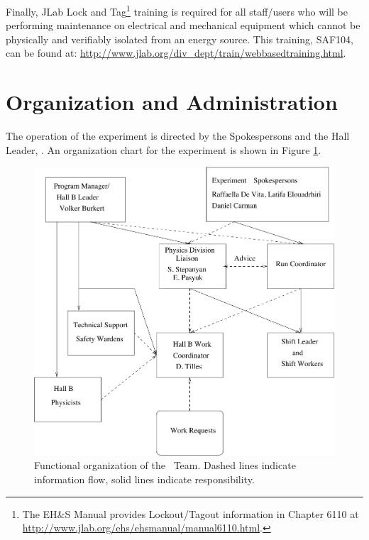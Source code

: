 \documentclass[11pt]{article}
\begin{document}
Finally, JLab Lock and Tag\footnote{The EH\&S Manual provides Lockout/Tagout
information in Chapter 6110 at \url{http://www.jlab.org/ehs/ehsmanual/manual6110.html}.}
training is required for all staff/users who will be
performing maintenance on electrical and mechanical equipment which  
cannot be physically and verifiably isolated from an energy
source.   This training, SAF104, can be found at:   \newline
\url{http://www.jlab.org/div_dept/train/webbasedtraining.html}.



\section{ Organization  and Administration}
\indent

The operation of the experiment is directed by the Spokespersons and the Hall 
Leader, \HALLLEADER. An organization chart for the experiment is
shown in Figure \ref{HALLCHART}.

\begin{figure}
\includegraphics[width=\textwidth]{coo_HallB_CLAS12_rgAorg.pdf}
\caption[Dummy caption.]{Functional organization of the \HALL\ Team. Dashed
lines indicate information flow, solid lines indicate responsibility.}
\label{HALLCHART} 
\end{figure}
\end{document}

